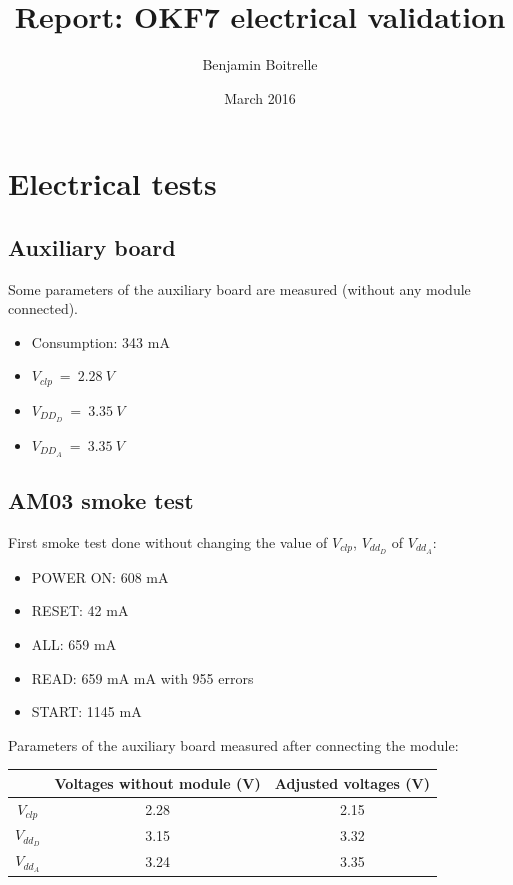 \documentclass[a4papper, 10pt]{article}
\title{Report: OKF7 electrical validation}
\author{Benjamin Boitrelle}
\date{March 2016}
\begin{document}
  \maketitle
  
  
  \section{Electrical tests}
  \subsection{Auxiliary board}
  
  Some parameters of the auxiliary board are measured (without any module connected).
  \begin{itemize}
    \item Consumption: 343 mA
    \item $V_{clp} \ = \ 2.28 \ V$
    \item $V_{DD_D} \ = \ 3.35 \ V$
    \item $V_{DD_A} \ = \ 3.35 \ V$
  \end{itemize}
  
  \subsection{AM03 smoke test}
  
  First smoke test done without changing the value of  $V_{clp}$, $V_{dd_D}$ of $V_{dd_A}$:
  \begin{itemize}
    \item POWER ON: 608 mA
    \item RESET: 42 mA
    \item ALL: 659 mA
    \item READ: 659 mA mA with 955 errors 
    \item START: 1145 mA 
  \end{itemize}
  
  Parameters of the auxiliary board measured after connecting the module:
  
  \begin{center}
    \begin{tabular}{ c c c}
    \hline %
      & Voltages without module (V) & Adjusted voltages (V) \tabularnewline
    \hline %
    \hline %
    $V_{clp}$ & 2.28 & 2.15 \tabularnewline
    $V_{dd_D}$ & 3.15 & 3.32 \tabularnewline
    $V_{dd_A}$ & 3.24 & 3.35 \tabularnewline
    \end{tabular}
  \end{center}
  
\end{document}
